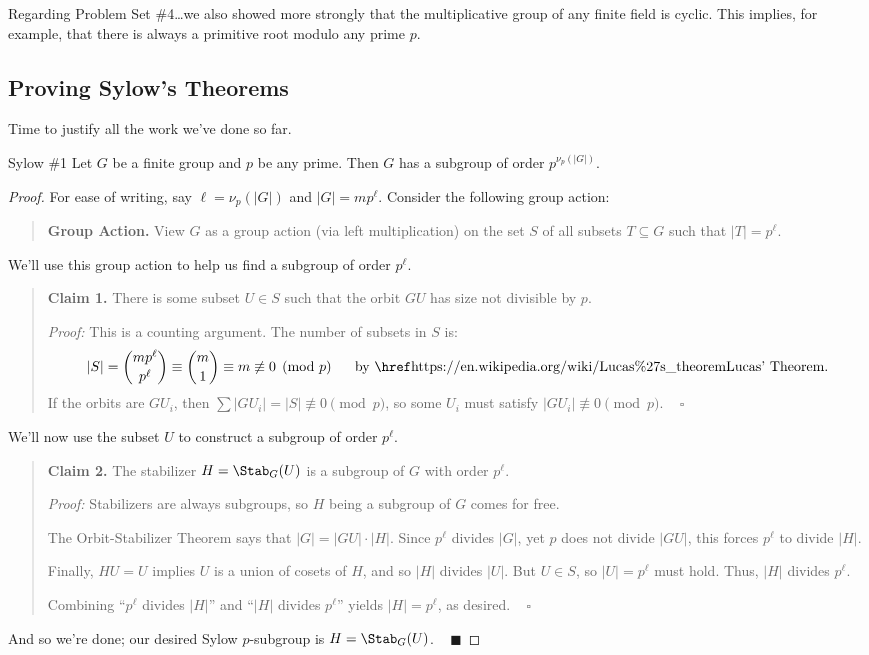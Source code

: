 \begin{remark}
    Regarding Problem Set \#4\dots we also showed more strongly that the multiplicative group of any finite field is cyclic.  This implies, for example, that there is always a primitive root modulo any prime $p$.
\end{remark}


\subsection{Proving Sylow's Theorems}

Time to justify all the work we've done so far.

\begin{theorem}{Sylow \#1}
    Let $G$ be a finite group and $p$ be any prime.  Then $G$ has a subgroup of order $p^{\nu_p(|G|)}$.
\end{theorem}

\begin{proof}
    For ease of writing, say $\ell = \nu_p(|G|)$ and $|G| = m p^{\ell}$.  Consider the following group action:
    \begin{quote}
        \textbf{Group Action.} View $G$ as a group action (via left multiplication) on the set $S$ of all subsets $T \subseteq G$ such that $|T| = p^{\ell}$.
    \end{quote}
    We'll use this group action to help us find a subgroup of order $p^{\ell}$.
    \begin{quote}
        \textbf{Claim 1.} There is some subset $U \in S$ such that the orbit $GU$ has size not divisible by $p$.

        \emph{Proof:} This is a counting argument.  The number of subsets in $S$ is:
        \[ |S| = \binom{mp^{\ell}}{p^{\ell}} \equiv \binom{m}{1} \equiv m \not \equiv 0  \pmod{p} ~~~~ \text{ by \href{https://en.wikipedia.org/wiki/Lucas\%27s\_theorem}{Lucas' Theorem}}. \]
        If the orbits are $GU_i$, then $\sum |GU_i| = |S| \not \equiv 0 \pmod{p}$, so some $U_i$ must satisfy $|GU_i| \not \equiv 0 \pmod{p}$. ~ $\square$
    \end{quote}
    We'll now use the subset $U$ to construct a subgroup of order $p^{\ell}$.
    \begin{quote}
        \textbf{Claim 2.} The stabilizer $H = \Stab_G(U)$ is a subgroup of $G$ with order $p^{\ell}$.

        \emph{Proof:} Stabilizers are always subgroups, so $H$ being a subgroup of $G$ comes for free.

        The Orbit-Stabilizer Theorem says that $|G| = |GU| \cdot |H|$.  Since $p^{\ell}$ divides $|G|$, yet $p$ does not divide $|GU|$, this forces $p^{\ell}$ to divide $|H|$.

        Finally, $HU = U$ implies $U$ is a union of cosets of $H$, and so $|H|$ divides $|U|$.  But $U \in S$, so $|U| = p^{\ell}$ must hold.  Thus, $|H|$ divides $p^{\ell}$.

        Combining ``$p^{\ell}$ divides $|H|$'' and ``$|H|$ divides $p^{\ell}$'' yields $|H| = p^{\ell}$, as desired. ~ $\square$
    \end{quote}
    And so we're done; our desired Sylow $p$-subgroup is $H = \Stab_G(U)$.  ~ $\blacksquare$
\end{proof}

